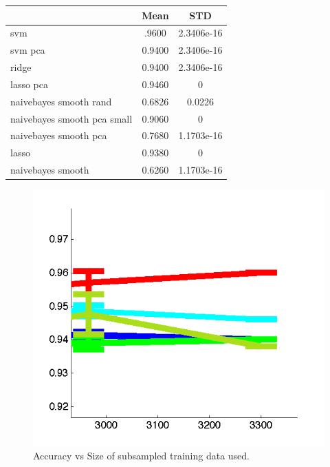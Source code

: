 \begin{tabular}{lcc}
\hline
& Mean & STD \\
\hline
svm & .9600 & 2.3406e-16\\
svm pca & 0.9400 & 2.3406e-16\\
ridge & 0.9400 & 2.3406e-16\\
lasso pca & 0.9460 & 0 \\
naivebayes smooth rand & 0.6826 & 0.0226\\
naivebayes smooth pca small & 0.9060 & 0\\
naivebayes smooth pca & 0.7680 & 1.1703e-16\\
lasso & 0.9380 & 0\\
naivebayes smooth & 0.6260 & 1.1703e-16
\end{tabular}
\begin{center}
\begin{figure}[!ht]
\centering
\includegraphics[width=.7\textwidth]{../images/c3zoombig.png}
\caption{Accuracy vs Size of subsampled training data used.}
\label{fig:largecomparekleg}
\end{figure}
\end{center}

